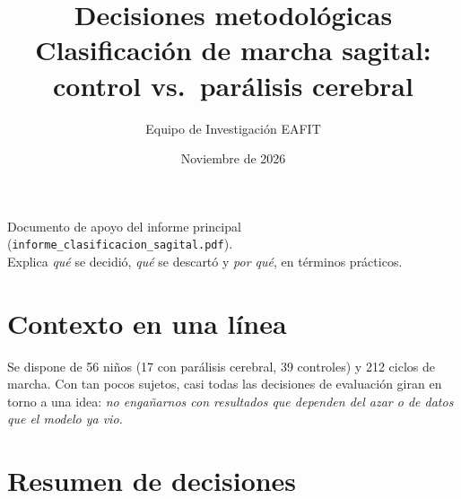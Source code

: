 \documentclass[11pt,a4paper]{article}
\title{\textbf{Decisiones metodológicas}\\[0.2em]\large Clasificación de marcha sagital: control vs.\ parálisis cerebral}
\author{Equipo de Investigación EAFIT}
\date{Noviembre de 2026}
\begin{document}
\maketitle
\thispagestyle{fancy}

\begin{center}\small
Documento de apoyo del informe principal (\texttt{informe\_clasificacion\_sagital.pdf}).\\
Explica \emph{qué} se decidió, \emph{qué} se descartó y \emph{por qué}, en términos prácticos.
\end{center}

\section{Contexto en una línea}

Se dispone de 56 niños (17 con parálisis cerebral, 39 controles) y 212 ciclos de marcha. Con tan pocos sujetos, casi todas las decisiones de evaluación giran en torno a una idea: \emph{no engañarnos con resultados que dependen del azar o de datos que el modelo ya vio.}

\section{Resumen de decisiones}
\end{document}
